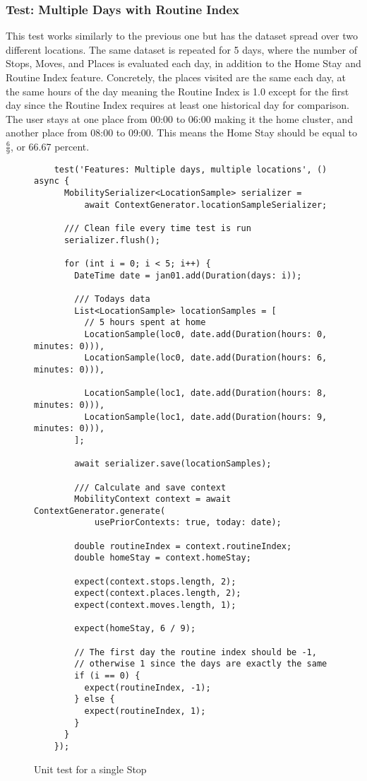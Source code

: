 \subsubsection*{Test: Multiple Days with Routine Index}
This test works similarly to the previous one but has the dataset spread over two different locations. The same dataset is repeated for 5 days, where the number of Stops, Moves, and Places is evaluated each day, in addition to the Home Stay and Routine Index feature. Concretely, the places visited are the same each day, at the same hours of the day meaning the Routine Index is 1.0 except for the first day since the Routine Index requires at least one historical day for comparison. The user stays at one place from 00:00 to 06:00 making it the home cluster, and another place from 08:00 to 09:00. This means the Home Stay should be equal to $\frac{6}{9}$, or 66.67 percent. 


\begin{figure}
    \centering
    \begin{verbatim}
    test('Features: Multiple days, multiple locations', () async {
      MobilitySerializer<LocationSample> serializer =
          await ContextGenerator.locationSampleSerializer;

      /// Clean file every time test is run
      serializer.flush();

      for (int i = 0; i < 5; i++) {
        DateTime date = jan01.add(Duration(days: i));

        /// Todays data
        List<LocationSample> locationSamples = [
          // 5 hours spent at home
          LocationSample(loc0, date.add(Duration(hours: 0, minutes: 0))),
          LocationSample(loc0, date.add(Duration(hours: 6, minutes: 0))),

          LocationSample(loc1, date.add(Duration(hours: 8, minutes: 0))),
          LocationSample(loc1, date.add(Duration(hours: 9, minutes: 0))),
        ];

        await serializer.save(locationSamples);

        /// Calculate and save context
        MobilityContext context = await ContextGenerator.generate(
            usePriorContexts: true, today: date);

        double routineIndex = context.routineIndex;
        double homeStay = context.homeStay;

        expect(context.stops.length, 2);
        expect(context.places.length, 2);
        expect(context.moves.length, 1);

        expect(homeStay, 6 / 9);

        // The first day the routine index should be -1,
        // otherwise 1 since the days are exactly the same
        if (i == 0) {
          expect(routineIndex, -1);
        } else {
          expect(routineIndex, 1);
        }
      }
    });
    \end{verbatim}
    \caption{Unit test for a single Stop}
    \label{fig:test-single-stop}
\end{figure}